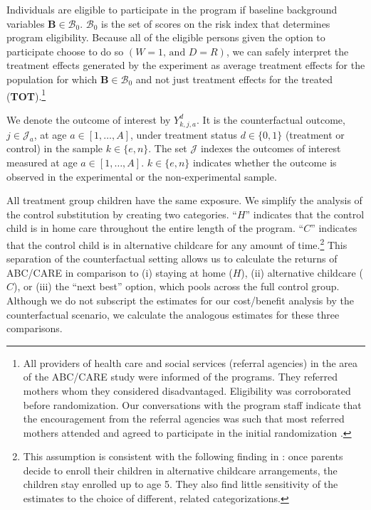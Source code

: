 Individuals are eligible to participate in the program if baseline background variables $\bm{B}\in\mathcal{B}_0$. $\mathcal{B}_0$ is the set of scores on the risk index that determines program eligibility. Because all of the eligible persons given the option to participate choose to do so $(W=1\text{, and } D=R)$, we can safely interpret the treatment effects generated by the experiment as average treatment effects for the population for which $\bm{B}\in\mathcal{B}_0$ and not just treatment effects for the treated (\textbf{TOT}).\footnote{All providers of health care and social services (referral agencies) in the area of the ABC/CARE study were informed of the programs. They referred mothers whom they considered disadvantaged. Eligibility was corroborated before randomization. Our conversations with the program staff indicate that the encouragement from the referral agencies was such that most referred mothers attended and agreed to participate in the initial randomization \citep{Ramey-etal_2012-ABC}.}

We denote the outcome of interest by $Y_{k,j,a}^d$. It is the counterfactual outcome, $j \in \mathcal{J}_a$, at age $a \in [1, \ldots, A]$, under treatment status $d \in \{0, 1\}$ (treatment or control) in the sample $k \in \{e, n \}$. The set $\mathcal{J}$ indexes the outcomes of interest measured at age $a \in [1, \ldots, A]$. $k \in \{e, n\}$ indicates whether the outcome is observed in the experimental or the non-experimental sample.

All treatment group children have the same exposure. We simplify the analysis of the control substitution by creating two categories. ``$H$'' indicates that the control child is in home care throughout the entire length of the program. ``$C$'' indicates that the control child is in alternative childcare for any amount of time.\footnote{This assumption is consistent with the following finding in \cite{Garcia_Heckman_Ziff_2017_Gender-Diff_UNPUBLISHED}: once parents decide to enroll their children in alternative childcare arrangements, the children stay enrolled up to age 5. They also find little sensitivity of the estimates to the choice of different, related categorizations.}  This separation of the counterfactual setting allows us to calculate the returns of ABC/CARE in comparison to (i) staying at home ($H$), (ii) alternative childcare ($C$), or (iii) the ``next best'' option, which pools across the full control group. Although we do not subscript the estimates for our cost/benefit analysis by the counterfactual scenario, we calculate the analogous estimates for these three comparisons.

